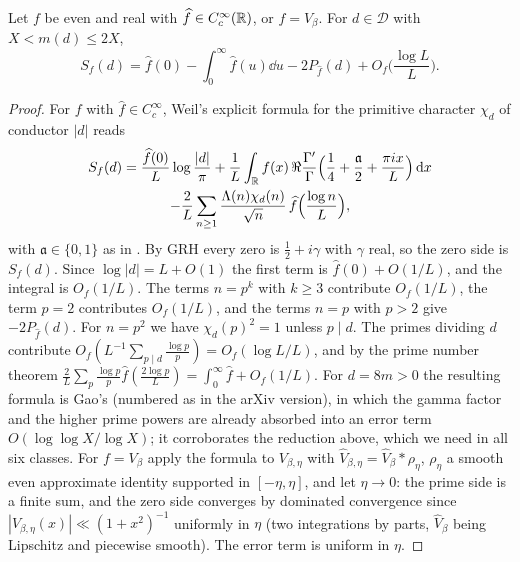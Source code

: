 \documentclass[11pt,colorlinks]{charlie}
\newcommand{\cD}{\mathcal{D}}
\begin{document}
\begin{lemma}\label{lem:explicit}
Let $f$ be even and real with $\widehat f\in C_c^\infty(\mathbb{R})$, or $f=V_\beta$. For $d\in\cD$ with $X<m(d)\le2X$,
\[
 S_f(d)=\widehat f(0)-\int_0^\infty\widehat f(u)\dd u-2P_{\widehat f}(d)+O_f\Big(\frac{\log L}L\Big).
\]
\end{lemma}
\begin{proof}
For $f$ with $\widehat f\in C_c^\infty$, Weil's explicit formula for the primitive character $\chi_d$ of conductor $|d|$ \cite[Theorem~5.12]{IK} reads
\begin{multline*}
 S_f(d)=\frac{\widehat f(0)}L\log\frac{|d|}\pi+\frac1L\int_{\mathbb{R}} f(x)\,\Re\frac{\Gamma'}{\Gamma}\Big(\frac14+\frac{\mathfrak a}2+\frac{\pi ix}L\Big)\,\mathrm{d} x\\
 -\frac2L\sum_{n\ge1}\frac{\Lambda(n)\chi_d(n)}{\sqrt n}\,\widehat f\Big(\frac{\log n}L\Big),
\end{multline*}
with $\mathfrak a\in\{0,1\}$ as in . By GRH \cite{Alpoge} every zero is $\frac12+i\gamma$ with $\gamma$ real, so the zero side is $S_f(d)$. Since $\log|d|=L+O(1)$ the first term is $\widehat f(0)+O(1/L)$, and the integral is $O_f(1/L)$. The terms $n=p^k$ with $k\ge3$ contribute $O_f(1/L)$, the term $p=2$ contributes $O_f(1/L)$, and the terms $n=p$ with $p>2$ give $-2P_{\widehat f}(d)$. For $n=p^2$ we have $\chi_d(p)^2=1$ unless $p\mid d$. The primes dividing $d$ contribute $O_f(L^{-1}\sum_{p\mid d}\frac{\log p}p)=O_f(\log L/L)$, and by the prime number theorem $\frac2L\sum_p\frac{\log p}p\widehat f(\frac{2\log p}L)=\int_0^\infty\widehat f+O_f(1/L)$. For $d=8m>0$ the resulting formula is Gao's \cite[Lemma~2.3]{Gao} (numbered as in the arXiv version), in which the gamma factor and the higher prime powers are already absorbed into an error term $O(\log\log X/\log X)$; it corroborates the reduction above, which we need in all six classes. For $f=V_\beta$ apply the formula to $V_{\beta,\eta}$ with $\widehat V_{\beta,\eta}=\widehat V_\beta*\rho_\eta$, $\rho_\eta$ a smooth even approximate identity supported in $[-\eta,\eta]$, and let $\eta\to0$: the prime side is a finite sum, and the zero side converges by dominated convergence since $|V_{\beta,\eta}(x)|\ll(1+x^2)^{-1}$ uniformly in $\eta$ (two integrations by parts, $\widehat V_\beta$ being Lipschitz and piecewise smooth). The error term is uniform in $\eta$.
\end{proof}
\end{document}
